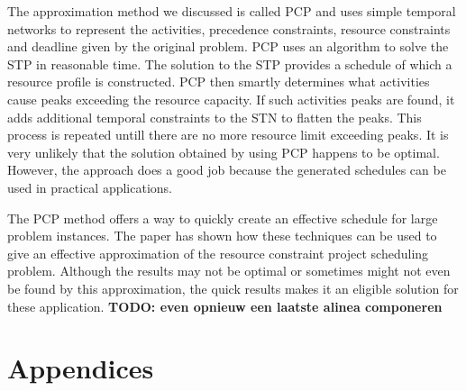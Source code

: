 \documentclass{article}
\theoremstyle{definition}
\newcommand{\TODO}[1]{{\color{red}\textbf{TODO: #1}}}
\begin{document}
The approximation method we discussed is called PCP and uses simple temporal networks to represent the activities, precedence constraints, resource constraints and deadline given by the original problem. 
PCP uses an algorithm to solve the STP in reasonable time. 
The solution to the STP provides a schedule of which a resource profile is constructed. 
PCP then smartly determines what activities cause peaks exceeding the resource capacity. 
If such activities peaks are found, it adds additional temporal constraints to the STN to flatten the peaks. 
This process is repeated untill there are no more resource limit exceeding peaks. 
It is very unlikely that the solution obtained by using PCP happens to be optimal. 
However, the approach does a good job because the generated schedules can be used in practical applications. 

The PCP method offers a way to quickly create an effective schedule for large problem instances. 
The paper has shown how these techniques can be used to give an effective approximation of the resource constraint project scheduling problem.
Although the results may not be optimal or sometimes might not even be found by this approximation, the quick results makes it an eligible solution for these application. \TODO{even opnieuw een laatste alinea componeren}

\newpage



\section{Appendices}
\end{document}
